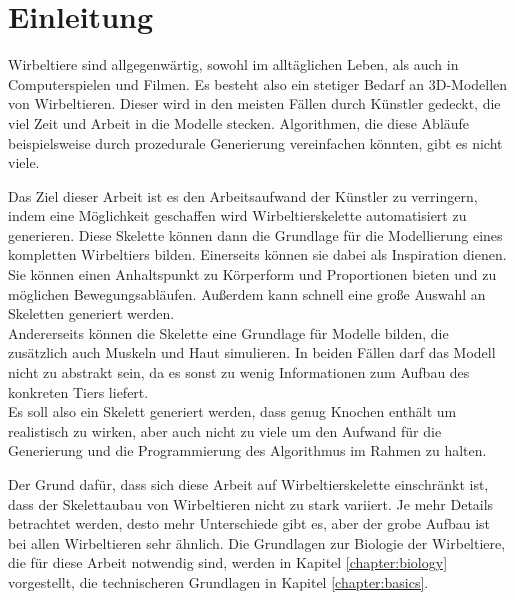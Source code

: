 \chapter{Einleitung}

Wirbeltiere sind allgegenwärtig, sowohl im alltäglichen Leben, als auch in Computerspielen und Filmen. Es besteht also ein stetiger Bedarf an 3D-Modellen von Wirbeltieren. Dieser wird in den meisten Fällen durch Künstler gedeckt, die viel Zeit und Arbeit in die Modelle stecken. Algorithmen, die diese Abläufe beispielsweise durch prozedurale Generierung vereinfachen könnten, gibt es nicht viele.

Das Ziel dieser Arbeit ist es den Arbeitsaufwand der Künstler zu verringern, indem eine Möglichkeit geschaffen wird Wirbeltierskelette automatisiert zu generieren. Diese Skelette können dann die Grundlage für die Modellierung eines kompletten Wirbeltiers bilden.
Einerseits können sie dabei als Inspiration dienen. Sie können einen Anhaltspunkt zu Körperform und Proportionen bieten und zu möglichen Bewegungsabläufen. Außerdem kann schnell eine große Auswahl an Skeletten generiert werden.\\
Andererseits können die Skelette eine Grundlage für Modelle bilden, die zusätzlich auch Muskeln und Haut simulieren.
In beiden Fällen darf das Modell nicht zu abstrakt sein, da es sonst zu wenig Informationen zum Aufbau des konkreten Tiers liefert.\\
Es soll also ein Skelett generiert werden, dass genug Knochen enthält um realistisch zu wirken, aber auch nicht zu viele um den Aufwand für die Generierung und die Programmierung des Algorithmus im Rahmen zu halten.

Der Grund dafür, dass sich diese Arbeit auf Wirbeltierskelette einschränkt ist, dass der Skelettaubau von Wirbeltieren nicht zu stark variiert. 
Je mehr Details betrachtet werden, desto mehr Unterschiede gibt es, aber der grobe Aufbau ist bei allen Wirbeltieren sehr ähnlich. Die Grundlagen zur Biologie der Wirbeltiere, die für diese Arbeit notwendig sind, werden in Kapitel \ref{chapter:biology} vorgestellt, die technischeren Grundlagen in Kapitel \ref{chapter:basics}.

